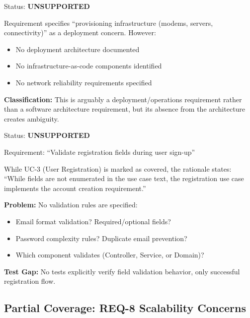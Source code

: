 \documentclass[11pt,a4paper]{article}
\begin{document}
\begin{tcolorbox}[colback=criticalred!5,colframe=criticalred,title=\textbf{REQ-23: Infrastructure Provisioning}]
Status: \textbf{UNSUPPORTED}

Requirement specifies ``provisioning infrastructure (modems, servers, connectivity)'' as a deployment concern. However:
\begin{itemize}
    \item No deployment architecture documented
    \item No infrastructure-as-code components identified
    \item No network reliability requirements specified
\end{itemize}

\textbf{Classification:} This is arguably a deployment/operations requirement rather than a software architecture requirement, but its absence from the architecture creates ambiguity.
\end{tcolorbox}

\begin{tcolorbox}[colback=warningorange!5,colframe=warningorange,title=\textbf{REQ-28: Registration Field Validation}]
Status: \textbf{UNSUPPORTED}

Requirement: ``Validate registration fields during user sign-up''

While UC-3 (User Registration) is marked as covered, the rationale states: ``While fields are not enumerated in the use case text, the registration use case implements the account creation requirement.''

\textbf{Problem:} No validation rules are specified:
\begin{itemize}
    \item Email format validation? Required/optional fields?
    \item Password complexity rules? Duplicate email prevention?
    \item Which component validates (Controller, Service, or Domain)?
\end{itemize}

\textbf{Test Gap:} No tests explicitly verify field validation behavior, only successful registration flow.
\end{tcolorbox}

\subsection{Partial Coverage: REQ-8 Scalability Concerns}
\end{document}
